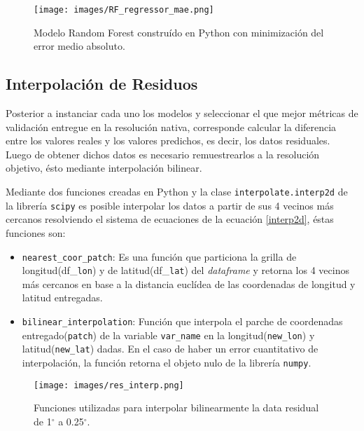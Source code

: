 \begin{figure}[h]
    \centering
          \texttt{[image: images/RF\_regressor\_mae.png]}
          \vskip -0.1in
    \caption[Construcción y entrenamiento del modelo Random Forest con criterio de \textit{mae}]{\footnotesize Modelo Random Forest construído en Python con minimización del error medio absoluto.}
    \label{logo3}
\end{figure}

    \subsection{Interpolación de Residuos}

    Posterior a instanciar cada uno los modelos y seleccionar el que mejor métricas de validación entregue en la resolución nativa, corresponde calcular la diferencia entre los valores reales y los valores predichos, es decir, los datos residuales.
    Luego de obtener dichos datos es necesario remuestrearlos a la resolución objetivo, ésto mediante interpolación bilinear.
 
    Mediante dos funciones creadas en Python y la clase \texttt{interpolate.interp2d} de la librería \texttt{scipy} es posible interpolar los datos a partir de sus 4 vecinos más cercanos resolviendo el sistema de ecuaciones
    de la ecuación \ref{interp2d}, éstas funciones son:
    \begin{itemize}
        \item {\texttt{nearest\_coor\_patch}: Es una función que particiona la grilla de longitud(df\_\texttt{lon}) y de latitud(df\_\texttt{lat}) del \textit{dataframe} y retorna los 4 vecinos más cercanos en base a la distancia euclídea
        de las coordenadas de longitud y latitud entregadas.}
        \item {\texttt{bilinear\_interpolation}: Función que interpola el parche de coordenadas entregado(\texttt{patch}) de la variable \texttt{var\_name} en la longitud(\texttt{new\_lon}) y latitud(\texttt{new\_lat}) dadas. En el caso de haber un error cuantitativo de interpolación,
         la función retorna el objeto nulo de la librería \texttt{numpy}.}
    \end{itemize}
    \begin{figure}[H]
        \centering
              \texttt{[image: images/res\_interp.png]}
              \vskip -0.1in
        \caption[Funciones utilizadas para la interpolación de residuos]{\footnotesize Funciones utilizadas para interpolar bilinearmente la data residual de 1$^{\circ}$ a 0.25$^{\circ}$.}
        \label{logo4}
    \end{figure}


